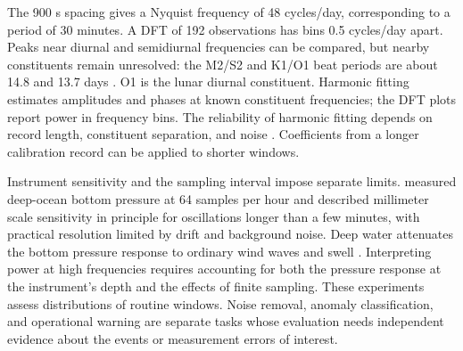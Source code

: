 \documentclass{article}
\begin{document}
The 900 s spacing gives a Nyquist frequency of 48 cycles/day, corresponding to a period of 30 minutes. A DFT of 192 observations has bins 0.5 cycles/day apart. Peaks near diurnal and semidiurnal frequencies can be compared, but nearby constituents remain unresolved: the M2/S2 and K1/O1 beat periods are about 14.8 and 13.7 days \citep{NOAA2000TideGlossary}. O1 is the lunar diurnal constituent. Harmonic fitting estimates amplitudes and phases at known constituent frequencies; the DFT plots report power in frequency bins. The reliability of harmonic fitting depends on record length, constituent separation, and noise \citep{Parker2007TidalAnalysis}. Coefficients from a longer calibration record can be applied to shorter windows.

Instrument sensitivity and the sampling interval impose separate limits. \citet{EbleGonzalez1991BottomPressure} measured deep-ocean bottom pressure at 64 samples per hour and described millimeter scale sensitivity in principle for oscillations longer than a few minutes, with practical resolution limited by drift and background noise. Deep water attenuates the bottom pressure response to ordinary wind waves and swell \citep[Section 2.2.1]{Meinig2005DARTII}. Interpreting power at high frequencies requires accounting for both the pressure response at the instrument's depth and the effects of finite sampling. These experiments assess distributions of routine windows. Noise removal, anomaly classification, and operational warning are separate tasks whose evaluation needs independent evidence about the events or measurement errors of interest.
\end{document}
